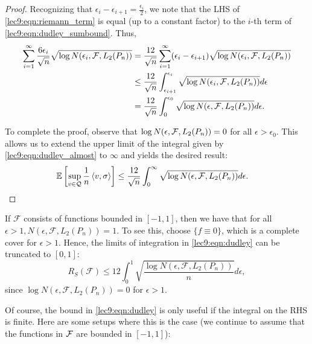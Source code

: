 \begin{proof}
    
    Recognizing that $\epsilon_i - \epsilon_{i + 1} = \frac{\epsilon_i}{2}$, we note that the LHS of \eqref{lec9:eqn:riemann_term} is equal (up to a constant factor) to the $i$-th term of \eqref{lec9:eqn:dudley_sumbound}. Thus,
    \begin{align}
        \sum_{i = 1}^\infty \frac{6 \epsilon_i}{\sqrt{n}}\sqrt{\log N(\epsilon_i, \mathcal F, L_2(P_n))} &= \frac{12}{\sqrt{n}} \sum_{i = 1}^\infty (\epsilon_i - \epsilon_{i + 1}) \sqrt{\log N(\epsilon_i, \mathcal F, L_2(P_n))} \label{lec9:eqn:dudley_rriemann} \\
        &\leq \frac{12}{\sqrt{n}} \int_{\epsilon_{i + 1}}^{\epsilon_i} \sqrt{\log N(\epsilon_i, \mathcal F, L_2(P_n))} d\epsilon \\
        &= \frac{12}{\sqrt{n}} \int_{0}^{\epsilon_0} \sqrt{\log N(\epsilon, \mathcal F, L_2(P_n))} d\epsilon. \label{lec9:eqn:dudley_almost}
    \end{align} 

    To complete the proof, observe that $\log N(\epsilon, \mathcal F, L_2(P_n)) = 0$ for all $\epsilon > \epsilon_0$. This allows us to extend the upper limit of the integral given by \eqref{lec9:eqn:dudley_almost} to $\infty$ and yields the desired result:
    \begin{align}
        \operatorname*{\mathbb{E}}\left[\sup_{v \in \mathcal Q} \frac 1 n \left\langle v, \sigma\right\rangle \right] & \le \frac{12}{\sqrt{n}} \int_{0}^\infty \sqrt{\log N(\epsilon, \mathcal F, L_2(P_n))} d\epsilon.
    \end{align}
\end{proof}

\begin{remark}
If $\mathcal{F}$ consists of functions bounded in $[-1,1]$, then we have that for all $\epsilon > 1, N(\epsilon, \mathcal{F}, L_2(P_n))=1$. To see this, choose $\{f\equiv 0\}$, which is a complete cover for $\epsilon>1$. Hence, the limits of integration in \eqref{lec9:eqn:dudley} can be truncated to $[0,1]$:
\begin{equation}
    R_S(\mathcal{F})\leq 12\int_{0}^{1}\sqrt{\frac{\log N(\epsilon, \mathcal{F}, L_2(P_n))}{n}}d\epsilon,
\end{equation}
    since $\log N(\epsilon, \mathcal{F}, L_2(P_n))=0$ for $\epsilon >1$.
\end{remark}

 \label{lec9:sec:cover_to_radem}

Of course, the bound in \eqref{lec9:eqn:dudley} is only useful if the integral on the RHS is finite. Here are some setups where this is the case (we continue to assume that the functions in $\mathcal F$ are bounded in $[-1, 1]$):

